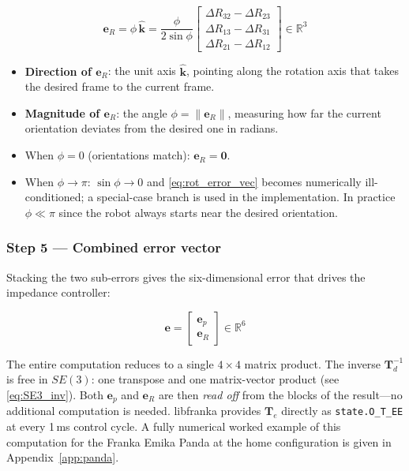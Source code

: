 \begin{equation}
\label{eq:rot_error_vec}
\mathbf{e}_R = \phi\,\hat{\mathbf{k}}
=
\frac{\phi}{2\sin\phi}
\begin{bmatrix}
\Delta R_{32}-\Delta R_{23} \\
\Delta R_{13}-\Delta R_{31} \\
\Delta R_{21}-\Delta R_{12}
\end{bmatrix}
\in\mathbb{R}^3
\end{equation}

\begin{itemize}
  \item \textbf{Direction of $\mathbf{e}_R$}: the unit axis
        $\hat{\mathbf{k}}$, pointing along the rotation axis that
        takes the desired frame to the current frame.
  \item \textbf{Magnitude of $\mathbf{e}_R$}: the angle
        $\phi=\|\mathbf{e}_R\|$, measuring how far the current
        orientation deviates from the desired one in radians.
  \item When $\phi=0$ (orientations match): $\mathbf{e}_R=\mathbf{0}$.
  \item When $\phi\to\pi$: $\sin\phi\to0$ and \cref{eq:rot_error_vec}
        becomes numerically ill-conditioned; a special-case branch is
        used in the implementation.
        In practice $\phi\ll\pi$ since the robot always starts near
        the desired orientation.
\end{itemize}

\subsubsection*{Step 5 --- Combined error vector}

Stacking the two sub-errors gives the six-dimensional error that
drives the impedance controller:

\begin{equation}
\label{eq:error}
\mathbf{e} =
\begin{bmatrix}
\mathbf{e}_p \\[2pt] \mathbf{e}_R
\end{bmatrix}
\in\mathbb{R}^6
\end{equation}

\begin{remark}
The entire computation reduces to a single $4{\times}4$ matrix product.
The inverse $\mathbf{T}_d^{-1}$ is free in $SE(3)$: one transpose and
one matrix-vector product (see \cref{eq:SE3_inv}).
Both $\mathbf{e}_p$ and $\mathbf{e}_R$ are then \emph{read off} from
the blocks of the result---no additional computation is needed.
libfranka provides $\mathbf{T}_e$ directly as
\texttt{state.O\_T\_EE} at every 1\,ms control cycle.
A fully numerical worked example of this computation for the
Franka Emika Panda at the home configuration is given in
Appendix~\ref{app:panda}.
\end{remark}

